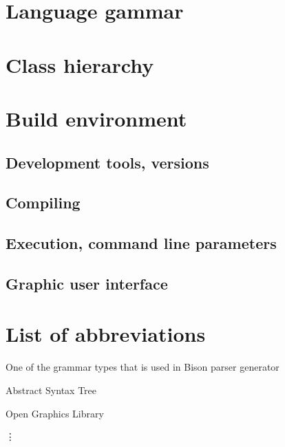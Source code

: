 \documentclass[11pt,twoside,a4paper]{book}
\begin{document}

%
%
%



\appendix


\chapter{Language gammar}



\chapter{Class hierarchy}



\chapter{Build environment}

\section{Development tools, versions}
\section{Compiling}
\section{Execution, command line parameters}
\section{Graphic user interface}



\chapter{List of abbreviations}
\begin{description}
\setlength{\labelwidth}{2.5cm}
\setlength{\itemindent}{1.5cm}
\item[LALR] One of the grammar types that is used in Bison parser generator
\item[AST] Abstract Syntax Tree
\item[OpenGL] Open Graphics Library
\end{description}
\vdots
\end{document}
